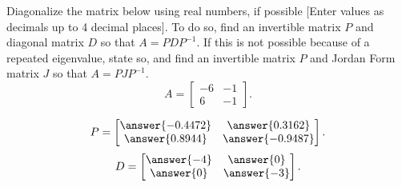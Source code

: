 \documentclass{ximera}
\begin{document}
\begin{exercise}
    Diagonalize the matrix below using real numbers, if possible [Enter values as decimals up to 4 decimal places]. To do so, find an invertible matrix $P$ and diagonal matrix $D$ so that $A = PDP^{-1}$. If this is not possible because of a repeated eigenvalue, state so, and find an invertible matrix $P$ and Jordan Form matrix $J$ so that $A = PJP^{-1}$. 
    \[ 
        A = 
        \begin{bmatrix} 
            -6 & -1 \\ 
            6 & -1 
        \end{bmatrix}.
    \]
    \begin{multipleChoice}
    \end{multipleChoice}
    \begin{problem}
        \[ 
            P = 
            \begin{bmatrix} 
                \answer{-0.4472} & \answer{0.3162} \\  
                \answer{0.8944} & \answer{-0.9487}
            \end{bmatrix}.
        \]
        \[ 
            D = 
            \begin{bmatrix} 
                \answer{-4} & \answer{0} \\  
                \answer{0} & \answer{-3}
            \end{bmatrix}.
        \]
    \end{problem}
\end{exercise} 
\end{document}
